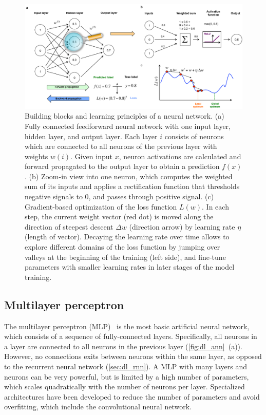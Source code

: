 \begin{figure}[htbp!]
\centering
\includegraphics[width=1.0\textwidth]{ann}
\caption[Building blocks and learning principles of a neural network.]{Building blocks and learning principles of a neural network. (a) Fully connected feedforward neural network with one input layer, hidden layer, and output layer.  Each layer $i$ consists of neurons which are connected to all neurons of the previous layer with weights $w(i)$. Given input $x$, neuron activations are calculated and forward propagated to the output layer to obtain a prediction $f(x)$. (b) Zoom-in view into one neuron, which computes the weighted sum of its inputs and applies a rectification function that thresholds negative signals to $0$, and passes through positive signal. (c) Gradient-based optimization of the loss function $L(w)$. In each step, the current weight vector (red dot) is moved along the direction of steepest descent $\Delta w$ (direction arrow) by learning rate $\eta$ (length of vector). Decaying the learning rate over time allows to explore different domains of the loss function by jumping over valleys at the beginning of the training (left side), and fine-tune parameters with smaller learning rates in later stages of the model training.}
\label{fig:dl_ann}
\end{figure}

\subsection{Multilayer perceptron}
The multilayer perceptron (MLP)~\citep{rosenblatt_perceptron:_1958} is the most basic artificial neural network, which consists of a sequence of fully-connected layers. Specifically, all neurons in a layer are connected to all neurons in the previous layer (\autoref{fig:dl_ann}~(a)). However, no connections exits between neurons within the same layer, as opposed to the recurrent neural network (\autoref{sec:dl_rnn}). A MLP with many layers and neurons can be very powerful, but is limited by a high number of parameters, which scales quadratically with the number of neurons per layer. Specialized architectures have been developed to reduce the number of parameters and avoid overfitting, which include the convolutional neural network.


